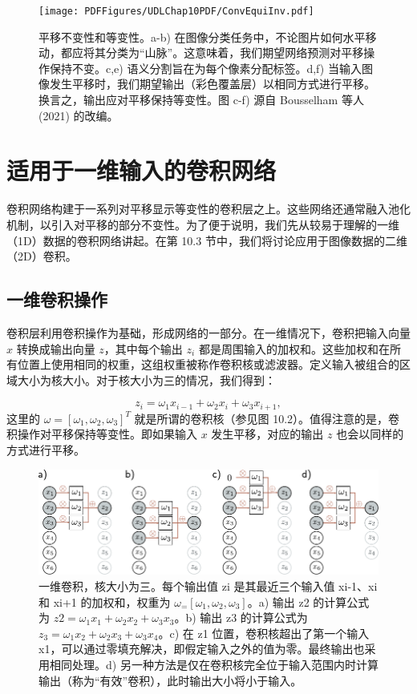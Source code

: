 \documentclass[lang=cn,newtx,10pt,scheme=chinese]{elegantbook}
\begin{document}
\begin{figure}[ht!]
\centering
\texttt{[image: PDFFigures/UDLChap10PDF/ConvEquiInv.pdf]}
\caption{平移不变性和等变性。a-b) 在图像分类任务中，不论图片如何水平移动，都应将其分类为“山脉”。这意味着，我们期望网络预测对平移操作保持不变。c,e) 语义分割旨在为每个像素分配标签。d,f) 当输入图像发生平移时，我们期望输出（彩色覆盖层）以相同方式进行平移。换言之，输出应对平移保持等变性。图 c-f) 源自 Bousselham 等人 (2021) 的改编。}
\end{figure}


\section{适用于一维输入的卷积网络}
卷积网络构建于一系列对平移显示等变性的卷积层之上。这些网络还通常融入池化机制，以引入对平移的部分不变性。为了便于说明，我们先从较易于理解的一维（1D）数据的卷积网络讲起。在第 10.3 节中，我们将讨论应用于图像数据的二维（2D）卷积。

\subsection{一维卷积操作}
卷积层利用卷积操作为基础，形成网络的一部分。在一维情况下，卷积把输入向量 \(x\) 转换成输出向量 \(z\)，其中每个输出 \(z_i\) 都是周围输入的加权和。这些加权和在所有位置上使用相同的权重，这组权重被称作卷积核或滤波器。定义输入被组合的区域大小为核大小。对于核大小为三的情况，我们得到：

\begin{equation}
z_i = \omega_1 x_{i-1} + \omega_2 x_i + \omega_3 x_{i+1}, 
\end{equation}
这里的 \(\omega = [\omega_1, \omega_2, \omega_3]^T\) 就是所谓的卷积核（参见图 10.2）。值得注意的是，卷积操作对平移保持等变性。即如果输入 \(x\) 发生平移，对应的输出 \(z\) 也会以同样的方式进行平移。


\begin{figure}[ht!]
\centering
\includegraphics[width=0.7\linewidth]{PDFFigures/UDLChap10PDF/Conv1.pdf}
\caption{一维卷积，核大小为三。每个输出值 zi 是其最近三个输入值 xi-1、xi 和 xi+1 的加权和，权重为 \(\omega_ = [\omega_1, \omega_2, \omega_3]\)。a) 输出 z2 的计算公式为 \(z2 = \omega_1x_1 + \omega_2x_2 + \omega_3x_3\)。b) 输出 z3 的计算公式为 \(z_3 = \omega_1x_2 + \omega_2x_3 + \omega_3x_4\)。c) 在 z1 位置，卷积核超出了第一个输入 x1，可以通过零填充解决，即假定输入之外的值为零。最终输出也采用相同处理。d) 另一种方法是仅在卷积核完全位于输入范围内时计算输出（称为“有效”卷积），此时输出大小将小于输入。}
\end{figure}
\end{document}
